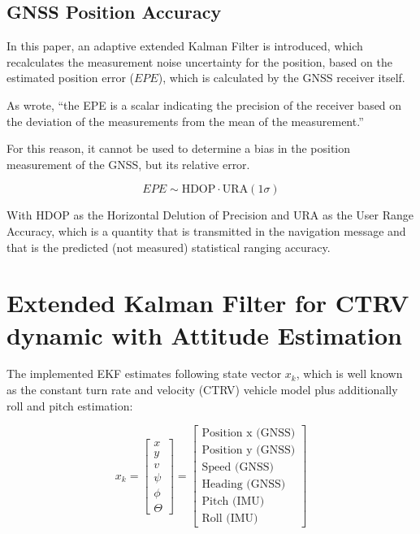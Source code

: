 \documentclass[conference]{IEEEtran}
\begin{document}
\subsection{GNSS Position Accuracy}

In this paper, an adaptive extended Kalman Filter is introduced, which recalculates the measurement noise uncertainty for the position, based on the estimated position error ($EPE$), which is calculated by the GNSS receiver itself.

As \cite{Sharif} wrote, ``the EPE is a scalar indicating the precision of the receiver based on the deviation of the measurements from the mean of the measurement.''

For this reason, it cannot be used to determine a bias in the position measurement of the GNSS, but its relative error.

\begin{equation}EPE \sim \mathrm{HDOP} \cdot \mathrm{URA}(1 \sigma)\end{equation}

With $\text{HDOP}$ as the Horizontal Delution of Precision and $\text{URA}$ as the User Range Accuracy, which is a quantity that is transmitted in the navigation message and that is the predicted (not measured) statistical ranging accuracy.


\section{Extended Kalman Filter for CTRV dynamic with Attitude Estimation}

The implemented EKF estimates following state vector $x_k$, which is well known as the constant turn rate and velocity (CTRV) vehicle model plus additionally roll and pitch estimation:

\begin{equation}\label{state}x_k= \left[ \begin{matrix} x\\y\\ v \\ \psi\\\phi\\\Theta \end{matrix}\right] = \left[ \begin{matrix} \text{Position x (GNSS)}\\ \text{Position y (GNSS)}\\ \text{Speed (GNSS)} \\ \text{Heading (GNSS)} \\ \text{Pitch (IMU)} \\ \text{Roll (IMU)} \end{matrix}\right]\end{equation}
\end{document}

